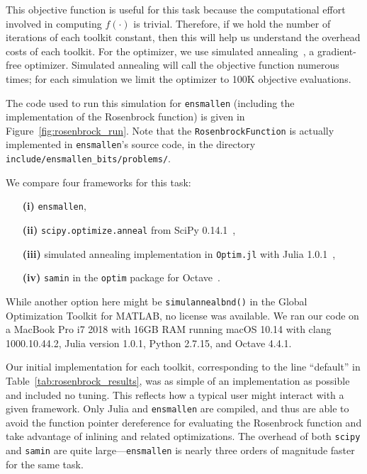 This objective function is useful for this task because the computational effort
involved in computing $f(\cdot)$ is trivial.  Therefore, if we hold the number
of iterations of each toolkit constant, then this will help us understand the
overhead costs of each toolkit.  For the optimizer, we use simulated
annealing~\cite{kirkpatrick1983optimization}, a gradient-free optimizer.
Simulated annealing will call the objective function numerous times; for each
simulation we limit the optimizer to 100K objective evaluations.

The code used to run this simulation for {\tt ensmallen} (including the
implementation of the Rosenbrock function) is given in
Figure~\ref{fig:rosenbrock_run}.  Note that the {\tt RosenbrockFunction} is
actually implemented in {\tt ensmallen}'s source code, in the directory {\tt
include/ensmallen\_bits/problems/}.


We compare four frameworks for this task:
%
\begin{itemize}
\itemsep=-1ex
  \item[{\bf (i)}] {\tt ensmallen},
  \item[{\bf (ii)}] {\tt scipy.optimize.anneal} from SciPy 0.14.1~\cite{jones2014scipy},
  \item[{\bf (iii)}] simulated annealing implementation in {\tt Optim.jl} with Julia 1.0.1~\cite{mogensen2018optim},
  \item[{\bf (iv)}] {\tt samin} in the {\tt optim} package for Octave~\cite{octave}.
\end{itemize}

While another option here might be {\tt simulannealbnd()}
in the Global Optimization Toolkit for MATLAB,
no license was available.
We ran our code on a MacBook Pro i7 2018 with 16GB RAM running macOS 10.14 with clang 1000.10.44.2, Julia version 1.0.1, Python 2.7.15, and Octave 4.4.1.

Our initial implementation for each toolkit, corresponding to the line
``default'' in Table~\ref{tab:rosenbrock_results}, was as simple of an
implementation as possible and included no tuning.  This reflects how a typical
user might interact with a given framework.  Only Julia and {\tt ensmallen} are
compiled, and thus are able to avoid the function pointer dereference for
evaluating the Rosenbrock function and take advantage of inlining and related
optimizations.  The overhead of both {\tt scipy} and {\tt samin} are quite
large---{\tt ensmallen} is nearly three orders of magnitude faster for the same
task.

